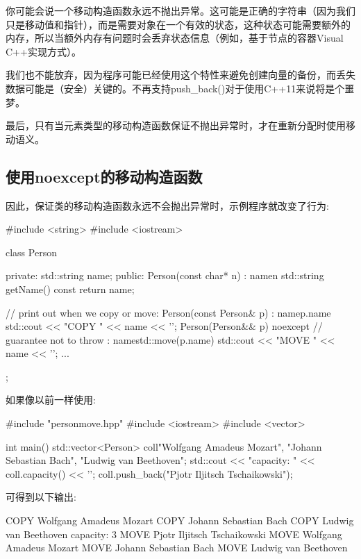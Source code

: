 你可能会说一个移动构造函数永远不抛出异常。这可能是正确的字符串（因为我们只是移动值和指针），而是需要对象在一个有效的状态，这种状态可能需要额外的内存，所以当额外内存有问题时会丢弃状态信息（例如，基于节点的容器Visual C++实现方式）。

我们也不能放弃，因为程序可能已经使用这个特性来避免创建向量的备份，而丢失数据可能是（安全）关键的。不再支持push_back()对于使用C++11来说将是个噩梦。

最后，只有当元素类型的移动构造函数保证不抛出异常时，才在重新分配时使用移动语义。

\subsection{使用noexcept的移动构造函数}

因此，保证类的移动构造函数永远不会抛出异常时，示例程序就改变了行为:

\begin{cppcode}
#include <string>
#include <iostream>

class Person {
	private:
	std::string name;
	public:
	Person(const char* n)
	: name{n} {
	}
	std::string getName() const {
		return name;
	}

	// print out when we copy or move:
	Person(const Person& p)
	: name{p.name} {
		std::cout << "COPY " << name << '\n';
	}
	Person(Person&& p) noexcept // guarantee not to throw
	: name{std::move(p.name)} {
		std::cout << "MOVE " << name << '\n';
	}
	...
};
\end{cppcode}

如果像以前一样使用:

\begin{cppcode}
#include "personmove.hpp"
#include <iostream>
#include <vector>

int main()
{
	std::vector<Person> coll{"Wolfgang Amadeus Mozart",
		"Johann Sebastian Bach",
		"Ludwig van Beethoven"};
	std::cout << "capacity: " << coll.capacity() << '\n';
	coll.push_back("Pjotr Iljitsch Tschaikowski");
}
\end{cppcode}

可得到以下输出:

\begin{outputcode}
COPY Wolfgang Amadeus Mozart
COPY Johann Sebastian Bach
COPY Ludwig van Beethoven
capacity: 3
MOVE Pjotr Iljitsch Tschaikowski
MOVE Wolfgang Amadeus Mozart
MOVE Johann Sebastian Bach
MOVE Ludwig van Beethoven
\end{outputcode}

